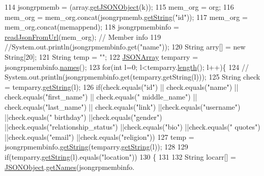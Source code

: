 \begin{DoxyCode}
114     jsongrpmemb = (array.\hyperlink{classorg_1_1json_1_1_j_s_o_n_array_a7f3e6fc64826daba30f40964cd92e57e}{getJSONObject}(k));
115     mem\_org = org;
116     mem\_org = mem\_org.concat(jsongrpmemb.\hyperlink{classorg_1_1json_1_1_j_s_o_n_object_a7140df2bac96f4d75a3f338ed16d1212}{getString}(\textcolor{stringliteral}{"id"}));
117     mem\_org = mem\_org.concat(memappend);
118     jsongrpmembinfo = \hyperlink{class_json_reader_a3775f51fc2a7f68a3ac711dc256283de}{readJsonFromUrl}(mem\_org); \textcolor{comment}{// Member info}
119     \textcolor{comment}{//System.out.println(jsongrpmembinfo.get("name"));}
120     String arry[] = \textcolor{keyword}{new} String[20];
121     String temp = \textcolor{stringliteral}{""};
122     \hyperlink{classorg_1_1json_1_1_j_s_o_n_array}{JSONArray} temparry = jsongrpmembinfo.\hyperlink{classorg_1_1json_1_1_j_s_o_n_object_a02e83de70e290231527d1760c4dd30fc}{names}();
123     \textcolor{keywordflow}{for}(\textcolor{keywordtype}{int} l=0; l<temparry.\hyperlink{classorg_1_1json_1_1_j_s_o_n_array_a8382a78090007f650a02895ecbf3c8ec}{length}(); l++)\{
124    \textcolor{comment}{// System.out.println(jsongrpmembinfo.get(temparry.getString(l)));}
125         String check = temparry.\hyperlink{classorg_1_1json_1_1_j_s_o_n_array_a3b52ac3d94f48cdddf503e7872653591}{getString}(l);
126         \textcolor{keywordflow}{if}(check.equals(\textcolor{stringliteral}{"id"}) || check.equals(\textcolor{stringliteral}{"name"}) || check.equals(\textcolor{stringliteral}{"first\_name"}) || check.equals(\textcolor{stringliteral}{"
      middle\_name"}) || check.equals(\textcolor{stringliteral}{"last\_name"}) || check.equals(\textcolor{stringliteral}{"link"}) ||check.equals(\textcolor{stringliteral}{"username"}) ||check.equals(\textcolor{stringliteral}{"
      birthday"}) ||check.equals(\textcolor{stringliteral}{"gender"}) ||check.equals(\textcolor{stringliteral}{"relationship\_status"}) ||check.equals(\textcolor{stringliteral}{"bio"}) ||check.equals(\textcolor{stringliteral}{"
      quotes"}) ||check.equals(\textcolor{stringliteral}{"email"}) ||check.equals(\textcolor{stringliteral}{"religion"}))
127         temp = jsongrpmembinfo.\hyperlink{classorg_1_1json_1_1_j_s_o_n_object_a7140df2bac96f4d75a3f338ed16d1212}{getString}(temparry.\hyperlink{classorg_1_1json_1_1_j_s_o_n_array_a3b52ac3d94f48cdddf503e7872653591}{getString}(l));
128         
129     \textcolor{keywordflow}{if}(temparry.\hyperlink{classorg_1_1json_1_1_j_s_o_n_array_a3b52ac3d94f48cdddf503e7872653591}{getString}(l).equals(\textcolor{stringliteral}{"location"}))
130     \{
131         
132         String locarr[] = \hyperlink{classorg_1_1json_1_1_j_s_o_n_object}{JSONObject}.\hyperlink{classorg_1_1json_1_1_j_s_o_n_object_a30d4e44e4c8e03341c346970a00ba283}{getNames}(jsongrpmembinfo.

\end{DoxyCode}
